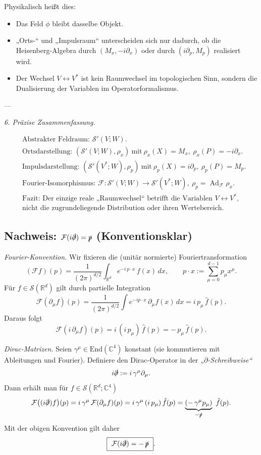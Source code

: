 \documentclass[10pt, letterpaper]{article}
\newcommand{\Ad}{\operatorname{Ad}}
\newcommand{\R}{\mathbb{R}}
\newcommand{\C}{\mathbb{C}}
\newcommand{\End}{\mathrm{End}}
\begin{document}
Physikalisch heißt dies:
\begin{itemize}
\item Das Feld \(\phi\) bleibt dasselbe Objekt.
\item „Orts-“ und „Impulsraum“ unterscheiden sich nur dadurch,
      ob die Heisenberg-Algebra durch $(M_x, -i\partial_x)$
      oder durch $(i\partial_p, M_p)$ realisiert wird.
\item Der Wechsel \(V\leftrightarrow V^\ast\) ist kein Raumwechsel im topologischen Sinn,
      sondern die Dualisierung der Variablen im Operatorformalismus.
\end{itemize}

---

\emph{6. Präzise Zusammenfassung.}

\[
\boxed{
\begin{aligned}
&\text{Abstrakter Feldraum: } \mathcal{S}'(V;W).\\
&\text{Ortsdarstellung: } (\mathcal{S}'(V;W),\rho_x)\ \text{mit}\ \rho_x(X)=M_x,\ \rho_x(P)=-i\partial_x.\\
&\text{Impulsdarstellung: } (\mathcal{S}'(V^\ast;W),\rho_p)\ \text{mit}\ \rho_p(X)=i\partial_p,\ \rho_p(P)=M_p.\\
&\text{Fourier-Isomorphismus: } \mathcal{F}:\mathcal{S}'(V;W)\to\mathcal{S}'(V^\ast;W),\ \rho_p=\Ad_{\mathcal{F}}\rho_x.\\[2mm]
&\text{Fazit: Der einzige reale „Raumwechsel“ betrifft die Variablen } V\leftrightarrow V^\ast,\\
&\text{nicht die zugrundeliegende Distribution oder ihren Wertebereich.}
\end{aligned}
}
\]


\subsection{Nachweis: \(\mathcal{F}(i\slashed{\partial})=\slashed{p}\) (Konventionsklar)}

\emph{Fourier-Konvention.}
Wir fixieren die (unitär normierte) Fouriertransformation
\[
(\mathcal{F}f)(p)
=\frac{1}{(2\pi)^{d/2}}\int_{\R^d} e^{-i\,p\cdot x}\,f(x)\,dx,
\qquad
p\cdot x:=\sum_{\mu=0}^{d-1}p_\mu x^\mu.
\]
Für \(f\in\mathcal{S}(\R^d)\) gilt durch partielle Integration
\[
\mathcal{F}(\partial_\mu f)(p)
=\frac{1}{(2\pi)^{d/2}}\int e^{-ip\cdot x}\,\partial_\mu f(x)\,dx
= i\,p_\mu\,\hat f(p).
\]
Daraus folgt
\[
\mathcal{F}(i\,\partial_\mu f)(p)=i\,(i\,p_\mu)\,\hat f(p)=-\,p_\mu\,\hat f(p).
\]

\emph{Dirac-Matrizen.}
Seien \(\gamma^\mu\in\End(\C^4)\) konstant (sie kommutieren mit Ableitungen und Fourier).
Definiere den Dirac-Operator in der \emph{„\(\partial\)-Schreibweise“}
\[
i\slashed{\partial}:=i\,\gamma^\mu\partial_\mu.
\]
Dann erhält man für \(f\in\mathcal{S}(\R^d;\C^4)\)
\[
\mathcal{F}\big((i\slashed{\partial})f\big)(p)
=i\,\gamma^\mu\,\mathcal{F}(\partial_\mu f)(p)
=i\,\gamma^\mu\,(i\,p_\mu)\,\hat f(p)
=\underbrace{(-\,\gamma^\mu p_\mu)}_{-\slashed{p}}\ \hat f(p).
\]
Mit der obigen Konvention gilt daher
\[
\boxed{\ \mathcal{F}(i\slashed{\partial})=-\,\slashed{p}\ }.
\]
\end{document}
